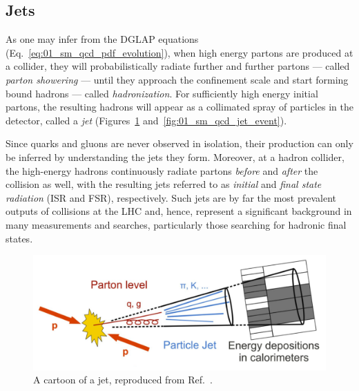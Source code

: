 \subsection{Jets}
\label{sec:01_sm_qcd_jets}

As one may infer from the DGLAP equations (Eq.~\ref{eq:01_sm_qcd_pdf_evolution}), when high energy partons are produced at a collider, they will probabilistically radiate further and further partons --- called \textit{parton showering} --- until they approach the confinement scale and start forming bound hadrons --- called \textit{hadronization}.
For sufficiently high energy initial partons, the resulting hadrons will appear as a collimated spray of particles in the detector, called a \textit{jet} (Figures~\ref{fig:01_sm_qcd_jet_cartoon} and~\ref{fig:01_sm_qcd_jet_event}).

Since quarks and gluons are never observed in isolation, their production can only be inferred by understanding the jets they form.
Moreover, at a hadron collider, the high-energy hadrons continuously radiate partons \textit{before} and \textit{after} the collision as well, with the resulting jets referred to as \textit{initial} and \textit{final state radiation} (ISR and FSR), respectively.
Such jets are by far the most prevalent outputs of collisions at the LHC and, hence, represent a significant background in many measurements and searches, particularly those searching for hadronic final states.

\begin{figure}[ht]
	\centering
	\captionsetup{justification=centering}
	\includegraphics[width=\textwidth]{figures/01-SM-03-SM/qcd/jet_cartoon.png}
	\caption{A cartoon of a jet, reproduced from Ref.~\cite{Kirschenmann:2014vga}.}
	\label{fig:01_sm_qcd_jet_cartoon}
\end{figure}

